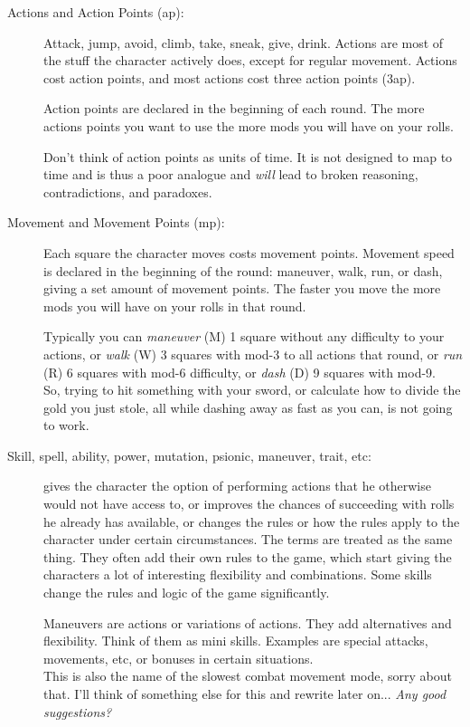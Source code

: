 \begin{description}
\item[Actions and Action Points (ap):]
Attack, jump, avoid, climb, take, sneak, give, drink. 
Actions are most of the stuff the character actively does, except for regular movement. Actions cost action points, and most actions cost three action points (3ap).

Action points are declared in the beginning of each round. The more actions points you want to use the more mods you will have on your rolls.

Don't think of action points as units of time. It is not designed to map to time and is thus a poor analogue and \emph{will} lead to broken reasoning, contradictions, and paradoxes.


\item[Movement and Movement Points (mp):]
Each square the character moves costs movement points. Movement speed is declared in the beginning of the round: maneuver, walk, run, or dash, giving a set amount of movement points. The faster you move the more mods you will have on your rolls in that round.

Typically you can \emph{maneuver} (M) 1 square without any difficulty to your actions, or \emph{walk} (W) 3 squares with mod-3 to all actions that round, or \emph{run} (R) 6 squares with mod-6 difficulty, or \emph{dash} (D) 9 squares with mod-9.\\
So, trying to hit something with your sword, or calculate how to divide the gold you just stole, all while dashing away as fast as you can, is not going to work.


\item[Skill, spell, ability, power, mutation, psionic, maneuver, trait, etc:] gives the character the option of performing actions that he otherwise would not have access to, or improves the chances of succeeding with rolls he already has available, or changes the rules or how the rules apply to the character under certain circumstances. The terms are treated as the same thing. They often add their own rules to the game, which start giving the characters a lot of interesting flexibility and combinations. Some skills change the rules and logic of the game significantly.

Maneuvers are actions or variations of actions. They add alternatives and flexibility. Think of them as mini skills. Examples are special attacks, movements, etc, or bonuses in certain situations.
\\   \todo This is also the name of the slowest combat movement mode, sorry about that. I'll think of something else for this and rewrite later on... \emph{Any good suggestions?}



\end{description}
